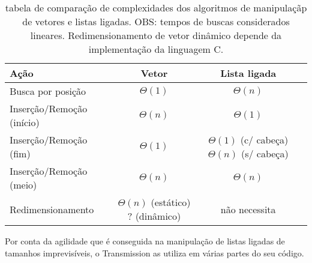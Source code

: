 \begin{table}
    \centering
    \begin{tabular}{| l | c | c | c |}
        \hline
        \textbf{Ação} & \textbf{Vetor} & \textbf{Lista ligada} \\
        \hline
        Busca por posição & $\Theta(1)$ & $\Theta(n)$ \\
        \hline
        Inserção/Remoção (início) & $\Theta(n)$ & $\Theta(1)$ \\
        \hline
        Inserção/Remoção (fim) & $\Theta(1)$ & \parbox[t]{.3\textwidth}{\centering $\Theta(1)$ (c/ cabeça) \\ $\Theta(n)$ (s/ cabeça)} \\
        \hline
        Inserção/Remoção (meio) & $\Theta(n)$ & $\Theta(n)$ \\
        \hline
        Redimensionamento & \parbox[t]{.25\textwidth}{\centering $\Theta(n)$ (estático) \\ ? (dinâmico)} & não necessita \\
        \hline
    \end{tabular}
    \caption{tabela de comparação de complexidades dos algoritmos de manipulaçãp de
    vetores e listas ligadas. OBS: tempos de buscas considerados lineares.
    Redimensionamento de vetor dinâmico depende da implementação da linguagem C.}
\end{table}

Por conta da agilidade que é conseguida na manipulação de listas ligadas de tamanhos
imprevisíveis, o Transmission as utiliza em várias partes do seu código.